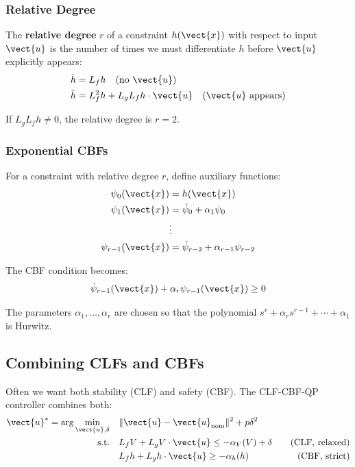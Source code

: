 \subsubsection{Relative Degree}

The \textbf{relative degree} $r$ of a constraint $h(\vect{x})$ with respect to input $\vect{u}$ is the number of times we must differentiate $h$ before $\vect{u}$ explicitly appears:
\begin{align}
\dot{h} &= L_f h \quad \text{(no } \vect{u} \text{)} \\
\ddot{h} &= L_f^2 h + L_g L_f h \cdot \vect{u} \quad \text{(} \vect{u} \text{ appears)}
\end{align}

If $L_g L_f h \neq 0$, the relative degree is $r = 2$.

\subsubsection{Exponential CBFs}

For a constraint with relative degree $r$, define auxiliary functions:
\begin{align}
\psi_0(\vect{x}) &= h(\vect{x}) \\
\psi_1(\vect{x}) &= \dot{\psi}_0 + \alpha_1 \psi_0 \\
&\vdots \\
\psi_{r-1}(\vect{x}) &= \dot{\psi}_{r-2} + \alpha_{r-1} \psi_{r-2}
\end{align}

The CBF condition becomes:
\begin{equation}
\dot{\psi}_{r-1}(\vect{x}) + \alpha_r \psi_{r-1}(\vect{x}) \geq 0
\end{equation}

The parameters $\alpha_1, \ldots, \alpha_r$ are chosen so that the polynomial $s^r + \alpha_r s^{r-1} + \cdots + \alpha_1$ is Hurwitz.

\subsection{Combining CLFs and CBFs}

Often we want both stability (CLF) and safety (CBF). The CLF-CBF-QP controller combines both:
\begin{align}
\vect{u}^* = \arg\min_{\vect{u}, \delta} \quad & \|\vect{u} - \vect{u}_{\text{nom}}\|^2 + p \delta^2 \\
\text{s.t.} \quad & L_f V + L_g V \cdot \vect{u} \leq -\alpha_V(V) + \delta \quad &\text{(CLF, relaxed)} \\
& L_f h + L_g h \cdot \vect{u} \geq -\alpha_h(h) \quad &\text{(CBF, strict)}
\label{eq:clf_cbf_qp}
\end{align}

